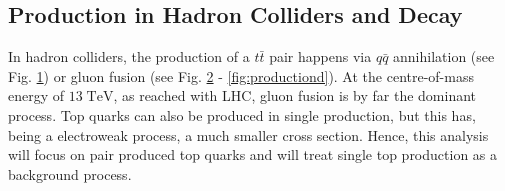 	\subsection{Production in Hadron Colliders and Decay}
	In hadron colliders, the production of a $t\bar{t}$ pair happens via $q\bar{q}$ annihilation (see Fig. \ref{fig:productiona}) or gluon fusion (see Fig. \ref{fig:productionb} - \ref{fig:productiond}). At the centre-of-mass energy of $13\;\text{TeV}$, as reached with LHC, gluon fusion is by far the dominant process. Top quarks can also be produced in single production, but this has, being a electroweak process, a much smaller cross section. Hence, this analysis will focus on pair produced top quarks and will treat single top production as a background process.
	\begin{figure}
		\centering
		\begin{subfigure}{.4\textwidth}
		\caption{}
		\label{fig:productiona}
		\end{subfigure}
		\begin{subfigure}{.4\textwidth}
		\caption{}
		\label{fig:productionb}
		\end{subfigure}		
		\begin{subfigure}{.4\textwidth}
\end{subfigure}
\end{figure}
